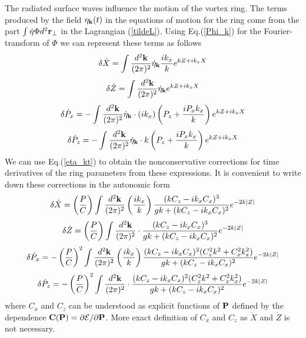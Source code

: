 The radiated surface waves influence the motion of the vortex ring. 
The terms produced by the field $\eta_{\bf k}(t)$ in the equations of motion 
for the ring come from the part $\int \dot\eta\Phi d^2{\bf r}_\bot$ 
in the Lagrangian (\ref{tildeL}). Using Eq.(\ref{Phi_k}) for 
the Fourier-transform of $\Phi$ we can represent these terms as follows
\begin{equation}
\delta \dot X=\int\frac{d^2{\bf k}}{(2\pi)^2}\dot\eta_{\bf k}
\frac{ik_x}{k}e^{kZ+ik_xX}
\end{equation}
\begin{equation}
\delta \dot Z=\int\frac{d^2{\bf k}}{(2\pi)^2}\dot\eta_{\bf k}
e^{kZ+ik_xX}
\end{equation}
\begin{equation}
\delta \dot P_x=-\int\frac{d^2{\bf k}}{(2\pi)^2}\dot\eta_{\bf k}\cdot(ik_x)
\left(P_z+\frac{iP_xk_x}{k}\right)e^{kZ+ik_xX}
\end{equation}
\begin{equation}
\delta \dot P_z=-\int\frac{d^2{\bf k}}{(2\pi)^2}\dot\eta_{\bf k}\cdot k
\left(P_z+\frac{iP_xk_x}{k}\right)e^{kZ+ik_xX}
\end{equation}
We can use Eq.(\ref{eta_kt}) to obtain  
the nonconservative corrections for time derivatives of the ring 
parameters from these expressions.
It is convenient to write down these corrections in the autonomic form
\begin{equation}\label{dX}
\delta \dot X=\left(\frac{P}{C}\right)\int\frac{d^2{\bf k}}{(2\pi)^2}
\left(\frac{ik_x}{k}\right)
\frac{(kC_z-ik_xC_x)^3}{gk+(kC_z-ik_xC_x)^2}
e^{-2k|Z|}
\end{equation}
\begin{equation}\label{dZ}
\delta \dot Z=\left(\frac{P}{C}\right)\int\frac{d^2{\bf k}}{(2\pi)^2}\cdot
\frac{(kC_z-ik_xC_x)^3}{gk+(kC_z-ik_xC_x)^2}
e^{-2k|Z|}
\end{equation}
\begin{equation}\label{dPx}
\delta \dot P_x=-\left(\frac{P}{C}\right)^2
\int\frac{d^2{\bf k}}{(2\pi)^2}\left(\frac{ik_x}{k}\right)
\frac{(kC_z-ik_xC_x)^2(C_z^2k^2+C_x^2k_x^2)}{gk+(kC_z-ik_xC_x)^2}e^{-2k|Z|}
\end{equation}
\begin{equation}\label{dPz}
\delta \dot P_z=-\left(\frac{P}{C}\right)^2
\int\frac{d^2{\bf k}}{(2\pi)^2}\cdot
\frac{(kC_z-ik_xC_x)^2(C_z^2k^2+C_x^2k_x^2)}{gk+(kC_z-ik_xC_x)^2}e^{-2k|Z|}
\end{equation}
where $C_x$ and $C_z$ can be understood as explicit functions of ${\bf P}$
defined by the dependence 
${\bf C}({\bf P})={\partial{\cal E}}/{\partial{\bf P}}$. 
More exact definition of $C_x$ and $C_z$ as $\dot X$ and $\dot Z$
is not necessary.

